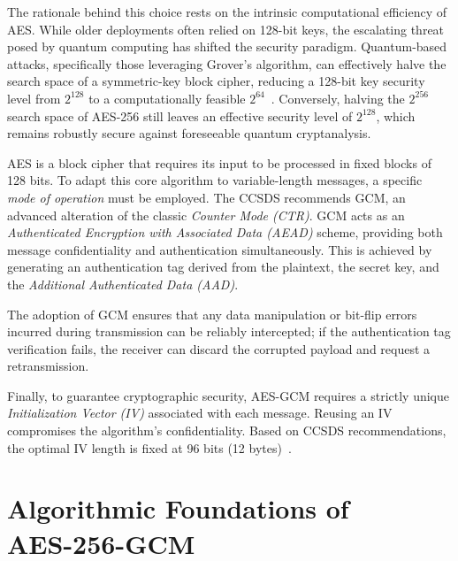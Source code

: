 \documentclass[11pt,a4paper]{report}
\begin{document}
The rationale behind this choice rests on the intrinsic computational efficiency of AES. 
While older deployments often relied on 128-bit keys, the escalating threat posed by quantum computing has shifted the security paradigm. 
Quantum-based attacks, specifically those leveraging Grover's algorithm, can effectively halve the search space of a symmetric-key block cipher, 
reducing a 128-bit key security level from $2^{128}$ to a computationally feasible $2^{64}$~\cite{quantum-AES-vulnerable}. 
Conversely, halving the $2^{256}$ search space of AES-256 still leaves an effective security level of $2^{128}$, which remains robustly secure against foreseeable quantum cryptanalysis.

AES is a block cipher that requires its input to be processed in fixed blocks of 128 bits. 
To adapt this core algorithm to variable-length messages, a specific \textit{mode of operation} must be employed. 
The CCSDS recommends GCM, an advanced alteration of the classic \textit{Counter Mode (CTR)}. 
GCM acts as an \textit{Authenticated Encryption with Associated Data (AEAD)} scheme, providing both message confidentiality and authentication simultaneously. 
This is achieved by generating an authentication tag derived from the plaintext, the secret key, and the \textit{Additional Authenticated Data (AAD)}.

The adoption of GCM ensures that any data manipulation or bit-flip errors incurred during transmission can be reliably intercepted; 
if the authentication tag verification fails, the receiver can discard the corrupted payload and request a retransmission. 

Finally, to guarantee cryptographic security, AES-GCM requires a strictly unique \textit{Initialization Vector (IV)} associated with each message. 
Reusing an IV compromises the algorithm's confidentiality. 
Based on CCSDS recommendations, the optimal IV length is fixed at 96 bits (12 bytes)~\cite{AES256-GCM}.







\chapter[Algorithmic Foundations of AES-256-GCM]{Algorithmic Foundations of \\ AES-256-GCM}
\end{document}
